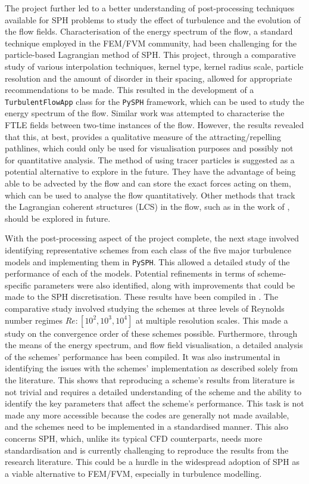 The project further led to a better understanding of post-processing techniques available for SPH problems to study the effect of turbulence and the evolution of the flow fields.
Characterisation of the energy spectrum of the flow, a standard technique employed in the FEM/FVM community, had been challenging for the particle-based Lagrangian method of SPH. 
This project, through a comparative study of various interpolation techniques, kernel type, kernel radius scale, particle resolution and the amount of disorder in their spacing, allowed for appropriate recommendations to be made. This resulted in the development of a \texttt{TurbulentFlowApp} class for the \texttt{PySPH} framework, which can be used to study the energy spectrum of the flow.
Similar work was attempted to characterise the FTLE fields between two-time instances of the flow. However, the results revealed that this, at best, provides a qualitative measure of the attracting/repelling pathlines, which could only be used for visualisation purposes and possibly not for quantitative analysis. The method of using tracer particles is suggested as a potential alternative to explore in the future. They have the advantage of being able to be advected by the flow and can store the exact forces acting on them, which can be used to analyse the flow quantitatively. Other methods that track the Lagrangian coherent structures (LCS) in the flow, such as in the work of \cite{shadden2005definition}, should be explored in future.

With the post-processing aspect of the project complete, the next stage involved identifying representative schemes from each class of the five major turbulence models and implementing them in \texttt{PySPH}.
This allowed a detailed study of the performance of each of the models. Potential refinements in terms of scheme-specific parameters were also identified, along with improvements that could be made to the SPH discretisation. These results have been compiled in .
The comparative study involved studying the schemes at three levels of Reynolds number regimes $Re: [10^2, 10^3, 10^4]$ at multiple resolution scales. This made a study on the convergence order of these schemes possible. Furthermore, through the means of the energy spectrum, and flow field visualisation, a detailed analysis of the schemes' performance has been compiled. It was also instrumental in identifying the issues with the schemes' implementation as described solely from the literature.
This shows that reproducing a scheme's results from literature is not trivial and requires a detailed understanding of the scheme and the ability to identify the key parameters that affect the scheme's performance. This task is not made any more accessible because the codes are generally not made available, and the schemes need to be implemented in a standardised manner.
This also concerns SPH, which, unlike its typical CFD counterparts, needs more standardisation and is currently challenging to reproduce the results from the research literature. This could be a hurdle in the widespread adoption of SPH as a viable alternative to FEM/FVM, especially in turbulence modelling.

